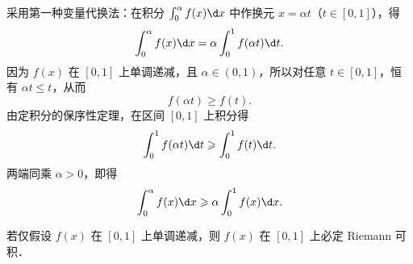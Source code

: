 \begin{solution}

    采用第一种变量代换法：在积分 $\int_0^\alpha f(x)\d x$ 中作换元 $x = \alpha t$（$t \in [0, 1]$），得
    \begin{equation}
        \int_0^\alpha f(x)\d x = \alpha \int_0^1 f(\alpha t)\d t.
    \end{equation}
    因为 $f(x)$ 在 $[0, 1]$ 上单调递减，且 $\alpha \in (0, 1)$，所以对任意 $t \in [0, 1]$，恒有 $\alpha t \leqslant t$，从而
    \begin{equation}
        f(\alpha t) \geqslant f(t).
    \end{equation}
    由定积分的保序性定理，在区间 $[0, 1]$ 上积分得
    \begin{equation}
        \int_0^1 f(\alpha t)\d t \geqslant \int_0^1 f(t)\d t.
    \end{equation}
    两端同乘 $\alpha > 0$，即得
    \begin{equation}
        \int_0^\alpha f(x)\d x \geqslant \alpha \int_0^1 f(x)\d x.
    \end{equation}


    若仅假设 $f(x)$ 在 $[0, 1]$ 上单调递减，则 $f(x)$ 在 $[0, 1]$ 上必定 Riemann 可积．


\end{solution}
